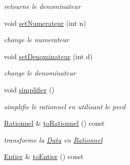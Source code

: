 \begin{DoxyCompactItemize}
\begin{DoxyCompactList}\small\item\em retourne le denominateur \item\end{DoxyCompactList}\item 
void \hyperlink{classNombre_1_1Rationnel_a18c8f925fd5d353e8b985c9ea725fb70}{setNumerateur} (int n)
\begin{DoxyCompactList}\small\item\em change le numerateur \item\end{DoxyCompactList}\item 
void \hyperlink{classNombre_1_1Rationnel_abe4d3136a4e1aa0d76575602d6e4630f}{setDenominateur} (int d)
\begin{DoxyCompactList}\small\item\em change le denominateur \item\end{DoxyCompactList}\item 
\hypertarget{classNombre_1_1Rationnel_a12ee060e5fca5f4291b222983d727268}{
void \hyperlink{classNombre_1_1Rationnel_a12ee060e5fca5f4291b222983d727268}{simplifier} ()}
\label{classNombre_1_1Rationnel_a12ee060e5fca5f4291b222983d727268}

\begin{DoxyCompactList}\small\item\em simplifie le rationnel en utilisant le pvcd \item\end{DoxyCompactList}\item 
\hypertarget{classNombre_1_1Rationnel_ae6cf0b5b3c8a7146f4f1d21a80f34397}{
\hyperlink{classNombre_1_1Rationnel}{Rationnel} \& \hyperlink{classNombre_1_1Rationnel_ae6cf0b5b3c8a7146f4f1d21a80f34397}{toRationnel} () const }
\label{classNombre_1_1Rationnel_ae6cf0b5b3c8a7146f4f1d21a80f34397}

\begin{DoxyCompactList}\small\item\em transforme la \hyperlink{classNombre_1_1Data}{Data} en \hyperlink{classNombre_1_1Rationnel}{Rationnel} \item\end{DoxyCompactList}\item 
\hypertarget{classNombre_1_1Rationnel_a441c5df2959c34f0253d40770467a2ed}{
\hyperlink{classNombre_1_1Entier}{Entier} \& \hyperlink{classNombre_1_1Rationnel_a441c5df2959c34f0253d40770467a2ed}{toEntier} () const }
\label{classNombre_1_1Rationnel_a441c5df2959c34f0253d40770467a2ed}


\end{DoxyCompactItemize}
